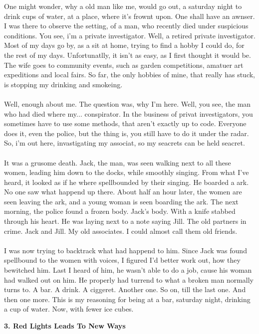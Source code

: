 \documentclass[]{article}
\begin{document}
One might wonder, why a old man like me, would go out, a saturday night to drink cups of water, at a place, where it's frownt upon. One shall have an awnser. I was there to observe the setting, of a man, who recently died under suspicious conditions. You see, i'm a private investigator. Well, a retired private investigator. Most of my days go by, as a sit at home, trying to find a hobby I could do, for the rest of my days. Unfortunatlly, it isn't as easy, as I first thought it would be. The wife goes to community events, such as garden competitions, amatuer art expeditions and local fairs. So far, the only hobbies of mine, that really has stuck, is stopping my drinking and smokeing. 
\\ \\
Well, enough about me. The question was, why I'm here. Well, you see, the man who had died where my... conspirator. In the business of privat investigators, you sometimes have to use some methods, that aren't exactly up to code. Everyone does it, even the police, but the thing is, you still have to do it under the radar. So, i'm out here, invastigating my associat, so my seacrets can be held seacret.
\\ \\
It was a grusome death. Jack, the man, was seen walking next to all these women, leading him down to the docks, while smoothly singing. From what I've heard, it looked as if he where spellbounded by their singing. He boarded a ark. No one saw what happend up there. About half an hour later, the women are seen leaving the ark, and a young woman is seen boarding the ark. The next morning, the police found a frozen body. Jack's body. With a knife stabbed through his heart. He was laying next to a note saying Jill. The old partners in crime. Jack and Jill. My old associates. I could almost call them old friends.
\\ \\
I was now trying to backtrack what had happend to him. Since Jack was found spellbound to the women with voices, I figured I'd better work out, how they bewitched him. Last I heard of him, he wasn't able to do a job, cause his woman had walked out on him. He properly had turrend to what a broken man normally turns to. A bar. A drink. A ciggeret. Another one. So on, till the last one. And then one more. This is my reasoning for being at a bar, saturday night, drinking a cup of water. Now, with fewer ice cubes.


\begin{center}
\large\textbf{3. Red Lights Leads To New Ways}
\end{center}
\end{document}
